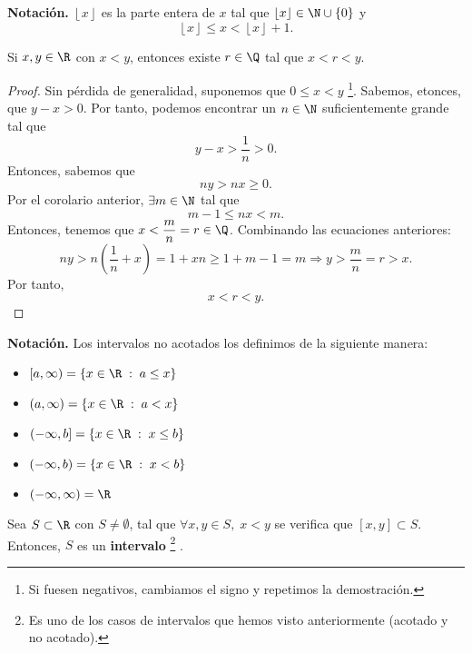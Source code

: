 \textbf{Notación.} $\displaystyle \left\lfloor x \right\rfloor $ es la parte entera de $\displaystyle x   $ tal que $\displaystyle \left\lfloor x \right\rfloor \in \N \cup \left\{ 0\right\}  $ y
\[\left\lfloor x \right\rfloor \leq x < \left\lfloor x \right\rfloor +1 .\]

\begin{ftheorem}
\normalfont Si $\displaystyle x,y \in \R $ con $\displaystyle x < y $, entonces existe $\displaystyle r \in \Q $ tal que $\displaystyle x < r < y $. 
\end{ftheorem}

\begin{proof}
Sin pérdida de generalidad, suponemos que $\displaystyle 0 \leq x < y $ \footnote{Si fuesen negativos, cambiamos el signo y repetimos la demostración.}. Sabemos, etonces, que $\displaystyle y - x > 0 $. Por tanto, podemos encontrar un $\displaystyle n \in \N $ suficientemente grande tal que 
\[y - x > \frac{1}{n} > 0 .\]
Entonces, sabemos que 
\[ny > nx \geq 0.\]
Por el corolario anterior, $\displaystyle \exists m \in \N $ tal que 
\[m-1\leq nx < m .\]
Entonces, tenemos que $\displaystyle x < \frac{m}{n} = r \in \Q $. Combinando las ecuaciones anteriores:
\[ny > n \left(\frac{1}{n} + x\right) = 1 + xn \geq 1 + m - 1 = m \Rightarrow y > \frac{m}{n}=r>x .\]
Por tanto, 
\[x < r < y .\]
\end{proof}

\textbf{Notación.} Los intervalos no acotados los definimos de la siguiente manera:
\begin{itemize}
	\item $\displaystyle [a,\infty) = \left\{ x \in \R \; : \; a \leq x\right\}  $ 
	\item $\displaystyle \left(a, \infty\right) = \left\{ x \in \R \; : \; a < x\right\}  $ 
	\item $\displaystyle (-\infty, b]  = \left\{ x \in \R\; : \; x \leq b\right\} $  
	\item $\displaystyle \left(-\infty, b\right) = \left\{ x \in \R \; : \; x < b\right\}  $ 
	\item $\displaystyle \left(- \infty, \infty\right) = \R $ 
\end{itemize}

\begin{ftheorem}[]
	\normalfont Sea $\displaystyle S \subset \R $ con $\displaystyle S \neq \emptyset $, tal que $\displaystyle \forall x, y \in S, \; x < y $ se verifica que $\displaystyle \left[x,y\right]  \subset S $. Entonces, $\displaystyle S $ es un \textbf{intervalo} \footnote{Es uno de los casos de intervalos que hemos visto anteriormente (acotado y no acotado).} .
\end{ftheorem}

